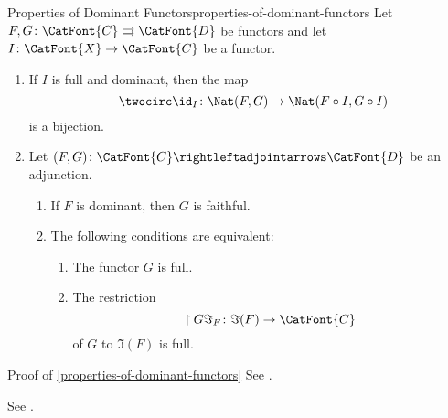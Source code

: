 \begin{proposition}{Properties of Dominant Functors}{properties-of-dominant-functors}%
    Let $F,G\colon\CatFont{C}\rightrightarrows\CatFont{D}$ be functors and let $I\colon\CatFont{X}\to\CatFont{C}$ be a functor.
    \begin{enumerate}
        \item\label{properties-of-dominant-functors-interaction-with-right-whiskering}If $I$ is full and dominant, then the map
            \[
                -\twocirc\id_{I}
                \colon%
                \Nat(F,G)%
                \to%
                \Nat(F\circ I,G\circ I)%
            \]%
            is a bijection.
        \item\label{properties-of-dominant-functors-interaction-with-adjunctions}Let $(F,G)\colon\CatFont{C}\rightleftadjointarrows\CatFont{D}$ be an adjunction.
            \begin{enumerate}
                \item\label{properties-of-dominant-functors-interaction-with-adjunctions-a}If $F$ is dominant, then $G$ is faithful.
                \item\label{properties-of-dominant-functors-interaction-with-adjunctions-b}The following conditions are equivalent:
                    \begin{enumerate}
                        \item\label{properties-of-dominant-functors-interaction-with-adjunctions-b-a}The functor $G$ is full.
                        \item\label{properties-of-dominant-functors-interaction-with-adjunctions-b-b}The restriction
                            \[
                                \restriction{G}{\Im_{F}}%
                                \colon%
                                \Im(F)%
                                \to%
                                \CatFont{C}%
                            \]%
                            of $G$ to $\Im(F)$ is full.
                    \end{enumerate}
            \end{enumerate}
    \end{enumerate}
\end{proposition}
\begin{Proof}{Proof of \cref{properties-of-dominant-functors}}%
    See \cite[Proposition 1.4]{idempotent-triples-and-completion}.

    See \cite[Proposition 1.7]{idempotent-triples-and-completion}.
\end{Proof}
